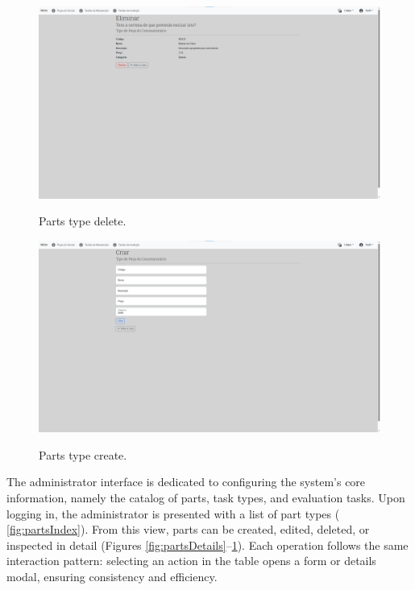 \begin{figure}[h]
  \caption{Parts type delete.}
  \centering
  \includegraphics[width=\textwidth]{figs/Implementation/dealershipAdmin/partsDelete}
  \label{fig:partsDelete}
\end{figure}


\begin{figure}[h]
  \caption{Parts type create.}
  \centering
  \includegraphics[width=\textwidth]{figs/Implementation/dealershipAdmin/partsCreate}
  \label{fig:partsCreate}
\end{figure}



The administrator interface is dedicated to configuring the system's core information, namely the catalog of parts, task types, and evaluation tasks. Upon logging in, the administrator is presented with a list of part types ( \ref{fig:partsIndex}). From this view, parts can be created, edited, deleted, or inspected in detail (Figures \ref{fig:partsDetails}–\ref{fig:partsDelete}). Each operation follows the same interaction pattern: selecting an action in the table opens a form or details modal, ensuring consistency and efficiency.



